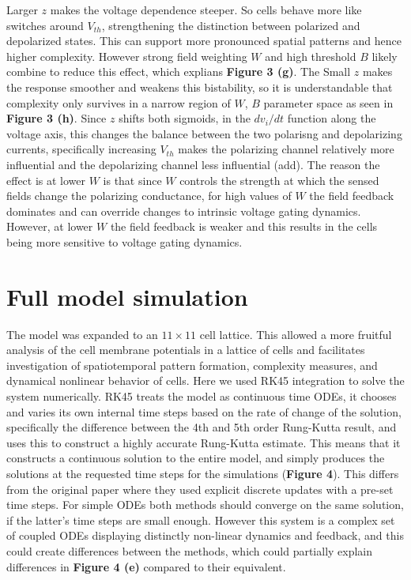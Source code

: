 \documentclass{article}
\begin{document}
\begin{flushleft}
Larger $z$ makes the voltage dependence steeper. So cells behave more like switches around $V_{th}$, strengthening the distinction between polarized and depolarized states. This can support more pronounced spatial patterns and hence higher complexity. However strong field weighting $W$ and high threshold $B$ likely combine to reduce this effect, which explians \textbf{Figure 3 (g)}. The Small $z$ makes the response smoother and weakens this bistability, so it is understandable that complexity only survives in a narrow region of $W$, $B$ parameter space as seen in \textbf{Figure 3 (h)}.
Since $z$ shifts both sigmoids, in the $dv_i/dt$ function along the voltage axis, this changes the balance between the two polarisng and depolarizing currents, specifically increasing $V_{th}$ makes the polarizing channel relatively more influential and the depolarizing channel less influential (add). The reason the effect is at lower $W$ is that since $W$ controls the strength at which the sensed fields change the polarizing conductance, for high values of $W$ the field feedback dominates and can override changes to intrinsic voltage gating dynamics. However, at lower $W$ the field feedback is weaker and this results in the cells being more sensitive to voltage gating dynamics. 



\hfill\break
\hfill\break

\section*{Full model simulation}

The model was expanded to an $11 \times 11$ cell lattice. This allowed a more fruitful analysis of the cell membrane potentials in a lattice of cells and facilitates investigation of spatiotemporal pattern formation, complexity measures, and dynamical nonlinear behavior of cells. 
Here we used RK45 integration to solve the system numerically. RK45 treats the model as continuous time ODEs, it chooses and varies its own internal time steps based on the rate of change of the solution, specifically the difference between the 4th and 5th order Rung-Kutta result, and uses this to construct a highly accurate Rung-Kutta estimate. This means that it constructs a continuous solution to the entire model, and simply produces the solutions at the requested time steps for the simulations (\textbf{Figure 4}). This differs from the original paper where they used explicit discrete updates with a pre-set time steps. For simple ODEs both methods should converge on the same solution, if the latter's time steps are small enough. However this system is a complex set of coupled ODEs displaying distinctly non-linear dynamics and feedback, and this could create differences between the methods, which could partially explain differences in \textbf{Figure 4 (e)} compared to their equivalent.  



\end{flushleft}
\end{document}
